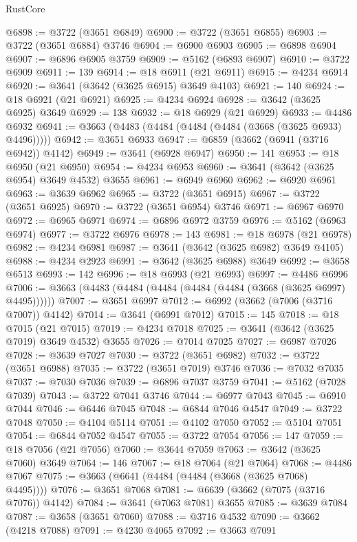 \begin{lexlean}{RustCore}
\begin{coremodule}
@6898 := @3722 (@3651 @6849)
@6900 := @3722 (@3651 @6855)
@6903 := @3722 (@3651 @6884) @3746
@6904 := @6900 @6903
@6905 := @6898 @6904
@6907 := @6896 @6905 @3759
@6909 := @5162 (@6893 @6907)
@6910 := @3722 @6909
@6911 := 139
@6914 := @18 @6911 (@21 @6911)
@6915 := @4234 @6914
@6920 := @3641 (@3642 (@3625 @6915) @3649 @4103)
@6921 := 140
@6924 := @18 @6921 (@21 @6921)
@6925 := @4234 @6924
@6928 := @3642 (@3625 @6925) @3649
@6929 := 138
@6932 := @18 @6929 (@21 @6929)
@6933 := @4486 @6932
@6941 := @3663 (@4483 (@4484 (@4484 (@4484 (@3668 (@3625 @6933) @4496)))))
@6942 := @3651 @6933
@6947 := @6859 (@3662 (@6941 (@3716 @6942)) @4142)
@6949 := @3641 (@6928 @6947)
@6950 := 141
@6953 := @18 @6950 (@21 @6950)
@6954 := @4234 @6953
@6960 := @3641 (@3642 (@3625 @6954) @3649 @4532) @3655
@6961 := @6949 @6960
@6962 := @6920 @6961
@6963 := @3639 @6962
@6965 := @3722 (@3651 @6915)
@6967 := @3722 (@3651 @6925)
@6970 := @3722 (@3651 @6954) @3746
@6971 := @6967 @6970
@6972 := @6965 @6971
@6974 := @6896 @6972 @3759
@6976 := @5162 (@6963 @6974)
@6977 := @3722 @6976
@6978 := 143
@6981 := @18 @6978 (@21 @6978)
@6982 := @4234 @6981
@6987 := @3641 (@3642 (@3625 @6982) @3649 @4105)
@6988 := @4234 @2923
@6991 := @3642 (@3625 @6988) @3649
@6992 := @3658 @6513
@6993 := 142
@6996 := @18 @6993 (@21 @6993)
@6997 := @4486 @6996
@7006 := @3663 (@4483 (@4484 (@4484 (@4484 (@4484 (@3668 (@3625 @6997) @4495))))))
@7007 := @3651 @6997
@7012 := @6992 (@3662 (@7006 (@3716 @7007)) @4142)
@7014 := @3641 (@6991 @7012)
@7015 := 145
@7018 := @18 @7015 (@21 @7015)
@7019 := @4234 @7018
@7025 := @3641 (@3642 (@3625 @7019) @3649 @4532) @3655
@7026 := @7014 @7025
@7027 := @6987 @7026
@7028 := @3639 @7027
@7030 := @3722 (@3651 @6982)
@7032 := @3722 (@3651 @6988)
@7035 := @3722 (@3651 @7019) @3746
@7036 := @7032 @7035
@7037 := @7030 @7036
@7039 := @6896 @7037 @3759
@7041 := @5162 (@7028 @7039)
@7043 := @3722 @7041 @3746
@7044 := @6977 @7043
@7045 := @6910 @7044
@7046 := @6446 @7045
@7048 := @6844 @7046 @4547
@7049 := @3722 @7048
@7050 := @4104 @5114
@7051 := @4102 @7050
@7052 := @5104 @7051
@7054 := @6844 @7052 @4547
@7055 := @3722 @7054
@7056 := 147
@7059 := @18 @7056 (@21 @7056)
@7060 := @3644 @7059
@7063 := @3642 (@3625 @7060) @3649
@7064 := 146
@7067 := @18 @7064 (@21 @7064)
@7068 := @4486 @7067
@7075 := @3663 (@6641 (@4484 (@4484 (@3668 (@3625 @7068) @4495))))
@7076 := @3651 @7068
@7081 := @6639 (@3662 (@7075 (@3716 @7076)) @4142)
@7084 := @3641 (@7063 @7081) @3655
@7085 := @3639 @7084
@7087 := @3658 (@3651 @7060)
@7088 := @3716 @4532
@7090 := @3662 (@4218 @7088)
@7091 := @4230 @4065
@7092 := @3663 @7091

\end{coremodule}
\end{lexlean}
